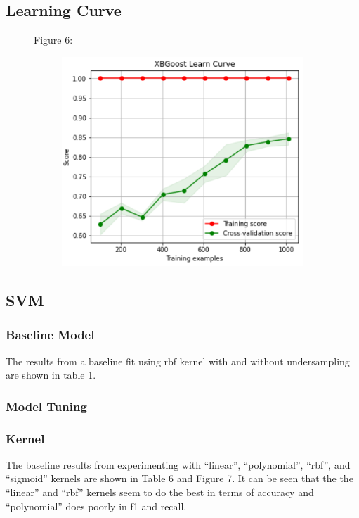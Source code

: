 \documentclass{article}
\begin{document}
\subsection*{Learning Curve}
\begin{figure}
	\centering
	Figure 6:\\
	\begin{subfigure}{0.4\textwidth}
		\centering
		\includegraphics[width=\linewidth]{poland_xgb_learning_curve.png}
		
	\end{subfigure}
	
	\label{fig:test}
\end{figure}

\subsection{SVM}
\subsubsection*{Baseline Model}
The results from a baseline fit using rbf kernel with and without undersampling are shown in table 1. 

\subsubsection*{Model Tuning}
\subsubsection*{Kernel}
The baseline results from experimenting with ``linear'', ``polynomial'', ``rbf'', and ``sigmoid'' kernels are shown in Table 6 and Figure 7. It can be seen that the the ``linear'' and ``rbf'' kernels seem to do the best in terms of accuracy and ``polynomial'' does poorly in f1 and recall. 
\end{document}
